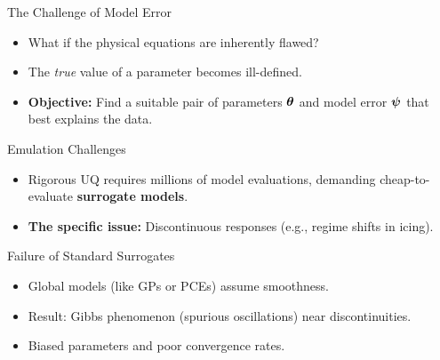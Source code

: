 \begin{frame}{The Challenge of Model Error}
    \begin{itemize}
        \item What if the physical equations are inherently flawed?
        \item The \textit{true} value of a parameter becomes ill-defined.
        \item \textbf{Objective:} Find a suitable pair of parameters $\boldsymbol{\theta}$ and model error $\boldsymbol{\psi}$ that best explains the data.
    \end{itemize}
    \vspace{0.3cm}
    \begin{center}
    \end{center}
\end{frame}

\begin{frame}{Emulation Challenges}
    \begin{itemize}
        \item Rigorous UQ requires millions of model evaluations, demanding cheap-to-evaluate \textbf{surrogate models}.
        \item \textbf{The specific issue:} Discontinuous responses (e.g., regime shifts in icing).
    \end{itemize}
    \vspace{0.3cm}
    \begin{block}{Failure of Standard Surrogates}
        \begin{itemize}
            \item Global models (like GPs or PCEs) assume smoothness.
            \item Result: Gibbs phenomenon (spurious oscillations) near discontinuities.
            \item Biased parameters and poor convergence rates.
        \end{itemize}
    \end{block}
\end{frame}
